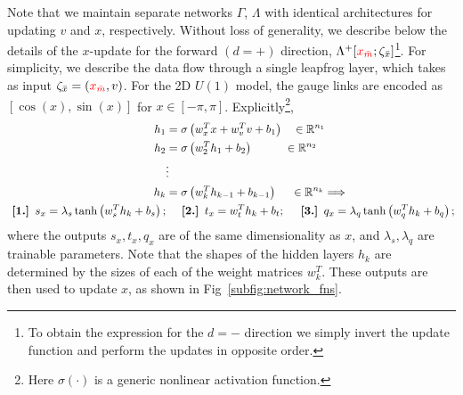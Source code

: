 \documentclass[a4paper,11pt]{article}
\newcommand{\xmaskbar}{\textcolor{red}{x_{\bar{m}}}}
\begin{document}
Note that we maintain separate networks \(\Gamma\), \(\Lambda\) with
identical architectures for updating \(v\) and \(x\), respectively.
%
Without loss of generality, we describe below the details of the \(x\)-update
for the forward \((d = +)\) direction, \(\Lambda^{+}[\xmaskbar;
\zeta_{\bar{x}}]\)\footnote{
    To obtain the expression for the \(d=-\) direction we simply invert the
    update function and perform the updates in opposite order.
}.
%
For simplicity, we describe the data flow through a single leapfrog layer,
%
which takes as input \(\zeta_{\bar{x}} = (\xmaskbar, v)\). For the 2D \(U(1)\)
model, the gauge links are encoded as \([\cos(x), \sin(x)]\) for \(x \in [-\pi,
\pi]\).
%
Explicitly\footnote{
    Here \(\sigma(\cdot)\) is a generic nonlinear activation function.
},
%
\begin{align}
    h_{1} &= \sigma\left(w_{x}^{T} x + w_{v}^{T} v + b_{1}\right)
        \quad \in \mathbb{R}^{n_{1}} \\
    h_{2} &= \sigma\left(w_{2}^{T} h_{1} + b_{2}\right)
        \hspace{0.085\textwidth} \in \mathbb{R}^{n_{2}} \\
    \nonumber& \vdots\\
    h_{k} &= \sigma\left(w_{k}^{T} h_{k-1} + b_{k-1}\right)
        \hspace{0.04\textwidth} \in \mathbb{R}^{n_{k}} \Longrightarrow \\
    \nonumber
    \textbf{  [1.]  } s_{x} = \lambda_{s} \tanh \left( w^{T}_{s} h_{k} + b_{s} \right);
    &\quad\textbf{  [2.]  } t_{x} = w^{T}_{t} h_{k} + b_{t};
    \quad\textbf{  [3.]  } q_{x} = \lambda_{q}\tanh\left(w^{T}_{q} h_{k} + b_{q}\right);
\end{align}
%
where the outputs \(s_{x}, t_{x}, q_{x}\) are of the same dimensionality as
\(x\), and \(\lambda_{s}, \lambda_{q}\) are trainable parameters.
%
Note that the shapes of the hidden layers \(h_{k}\) are determined by the sizes
of each of the weight matrices \(w_{k}^{T}\).
%
These outputs are then used to update \(x\), as shown in
Fig~\ref{subfig:network_fns}.
\end{document}
